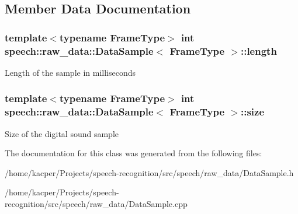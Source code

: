 \subsection{Member Data Documentation}
\hypertarget{classspeech_1_1raw__data_1_1DataSample_aeecd9add20856d81b34085090ef19d49}{
\subsubsection[{length}]{\setlength{\rightskip}{0pt plus 5cm}template$<$typename Frame\+Type$>$ int {\bf speech\+::raw\+\_\+data\+::\+Data\+Sample}$<$ Frame\+Type $>$\+::length\hspace{0.3cm}{\ttfamily [protected]}}}\label{classspeech_1_1raw__data_1_1DataSample_aeecd9add20856d81b34085090ef19d49}
Length of the sample in milliseconds \hypertarget{classspeech_1_1raw__data_1_1DataSample_a07f56392e007247976f6ab8c2c4edb95}{
\subsubsection[{size}]{\setlength{\rightskip}{0pt plus 5cm}template$<$typename Frame\+Type$>$ int {\bf speech\+::raw\+\_\+data\+::\+Data\+Sample}$<$ Frame\+Type $>$\+::size\hspace{0.3cm}{\ttfamily [protected]}}}\label{classspeech_1_1raw__data_1_1DataSample_a07f56392e007247976f6ab8c2c4edb95}
Size of the digital sound sample 

The documentation for this class was generated from the following files\+:\begin{DoxyCompactItemize}
\item 
/home/kacper/\+Projects/speech-\/recognition/src/speech/raw\+\_\+data/Data\+Sample.\+h\item 
/home/kacper/\+Projects/speech-\/recognition/src/speech/raw\+\_\+data/Data\+Sample.\+cpp\end{DoxyCompactItemize}
